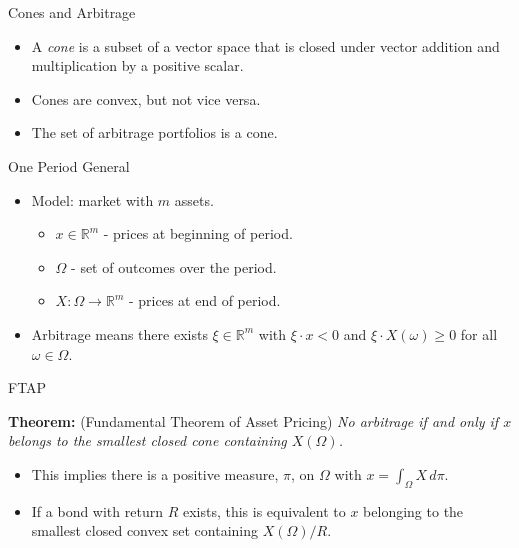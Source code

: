 \documentclass[fleqn]{amsart}
\newcommand{\RR}{\mathbb{R}}
\begin{document}
\begin{section}{Cones and Arbitrage}

\begin{itemize}

\item A {\em cone} is a subset of a vector space that is closed under
vector addition and multiplication by a positive scalar.

\item Cones are convex, but not vice versa.

\item The set of arbitrage portfolios is a cone.

\end{itemize}

\end{section}

\begin{section}{One Period General}

\begin{itemize}

\item Model: market with $m$ assets.
\begin{itemize}

\item $x\in\RR^m$ - prices at beginning of period.

\item $\Omega$ - set of outcomes over the period.

\item $X\colon\Omega\to\RR^m$ - prices at end of period.

\end{itemize}

\item Arbitrage means there exists $\xi\in\RR^m$ with $\xi\cdot x < 0$
and $\xi\cdot X(\omega)\ge0$ for all $\omega\in\Omega$.

\end{itemize}

\end{section}

\begin{section}{FTAP}

\medskip

{\bf Theorem:} {\rm (Fundamental Theorem of Asset Pricing)} {\it No arbitrage
if and only if $x$ belongs to the smallest closed cone containing
$X(\Omega)$.}

\medskip

\begin{itemize}

\item This implies there is a positive measure, $\pi$, on $\Omega$
with $x = \int_\Omega X\,d\pi$.

\item If a bond with return $R$ exists, this is equivalent to $x$
belonging to the smallest closed convex set containing $X(\Omega)/R$.

\end{itemize}

\end{section}
\end{document}
